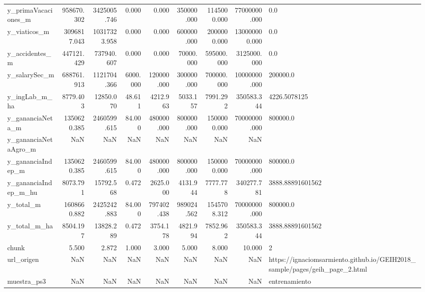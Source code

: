 \begin{longtable}{lrrrrrrrl}
y\_primaVacaciones\_m & 958670.302 & 3425005.746 & 0.000 & 0.000 & 350000.000 & 1145000.000 & 77000000.000 & 0.0 \\
y\_viaticos\_m & 3096817.043 & 10317323.958 & 0.000 & 0.000 & 600000.000 & 2000000.000 & 130000000.000 & 0.0 \\
y\_accidentes\_m & 447121.429 & 737940.607 & 0.000 & 0.000 & 70000.000 & 595000.000 & 3125000.000 & 0.0 \\
y\_salarySec\_m & 688761.913 & 1121704.366 & 6000.000 & 120000.000 & 300000.000 & 700000.000 & 10000000.000 & 200000.0 \\
y\_ingLab\_m\_ha & 8779.403 & 12850.070 & 48.611 & 4212.963 & 5033.157 & 7991.292 & 350583.344 & 4226.5078125 \\
y\_gananciaNeta\_m & 1350620.385 & 2460599.615 & 84.000 & 480000.000 & 800000.000 & 1500000.000 & 70000000.000 & 800000.0 \\
y\_gananciaNetaAgro\_m & NaN & NaN & NaN & NaN & NaN & NaN & NaN &  \\
y\_gananciaIndep\_m & 1350620.385 & 2460599.615 & 84.000 & 480000.000 & 800000.000 & 1500000.000 & 70000000.000 & 800000.0 \\
y\_gananciaIndep\_m\_hu & 8073.791 & 15792.568 & 0.472 & 2625.000 & 4131.944 & 7777.778 & 340277.781 & 3888.88891601562 \\
y\_total\_m & 1608660.882 & 2425242.883 & 84.000 & 797402.438 & 989024.562 & 1545708.312 & 70000000.000 & 800000.0 \\
y\_total\_m\_ha & 8504.197 & 13828.289 & 0.472 & 3754.178 & 4821.994 & 7852.962 & 350583.344 & 3888.88891601562 \\
chunk & 5.500 & 2.872 & 1.000 & 3.000 & 5.000 & 8.000 & 10.000 & 2 \\
url\_origen & NaN & NaN & NaN & NaN & NaN & NaN & NaN & https://ignaciomsarmiento.github.io/GEIH2018\_sample/pages/geih\_page\_2.html \\
muestra\_ps3 & NaN & NaN & NaN & NaN & NaN & NaN & NaN & entrenamiento \\
\end{longtable}
